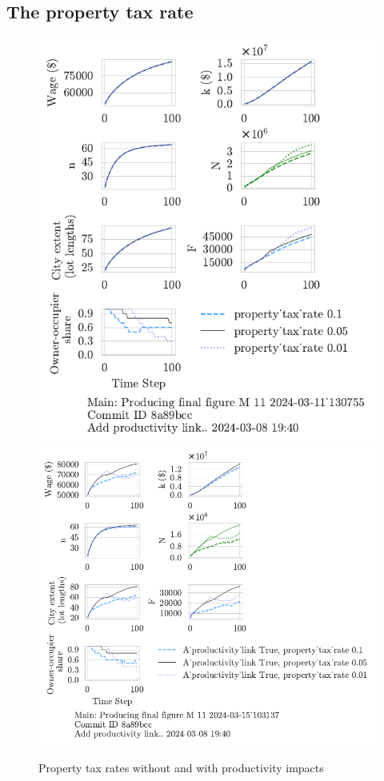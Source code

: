 \subsection{The property tax rate}
\begin{figure}[h!tb] 
    \centering
    \includegraphics[scale=.75, trim={0 1.4cm .8cm 0},clip]{fig/property_tax_rate-Main-130755.pdf} 
    \includegraphics[scale=.75, trim={0 1.4cm 4.75cm 0},clip]{fig/With-productivity_link-property_tax-103137.pdf} 
    \caption{Property tax rates without and with productivity impacts}
    \label{fig:Productivity_link_W-WO-property_tax}
\end{figure}

